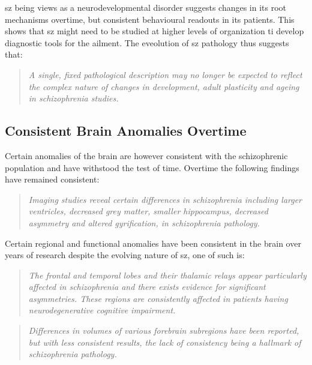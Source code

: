 \ac{sz} being views as a neurodevelopmental disorder suggests changes in its root mechanisms overtime, but consistent behavioural readouts in its patients. This shows that \ac{sz} might need to be studied at higher levels of organization ti develop diagnostic tools for the ailment. The eveolution of \ac{sz} pathology thus suggests that:
\begin{quotation}
	\textit{A single, fixed pathological description may no longer be expected to reflect the complex nature of changes in development, adult plasticity and ageing in schizophrenia studies.}
	\begin{flushright}
		\cite{bakhshi2015neuropathology}
	\end{flushright}
\end{quotation}

\subsection{Consistent Brain Anomalies Overtime}\label{brain_anomalies}
Certain anomalies of the brain are however consistent with the schizophrenic population and have withstood the test of time. Overtime the following findings have remained consistent:
\begin{quotation}
	\textit{Imaging studies reveal certain differences in schizophrenia including larger ventricles, decreased grey matter, smaller hippocampus, decreased asymmetry and altered gyrification, in schizophrenia pathology.}
	\begin{flushright}
		\cite{bakhshi2015neuropathology}
	\end{flushright}
\end{quotation}
Certain regional and functional anomalies have been consistent in the brain over years of research despite the evolving nature of \ac{sz}, one of such is:
\begin{quotation}
	\textit{The frontal and temporal lobes and their thalamic relays appear particularly affected in schizophrenia and there exists evidence for significant asymmetries. These regions are consistently affected in patients having neurodegenerative cognitive impairment.}
	\begin{flushright}
		\cite{halliday2001proceedings}
	\end{flushright}
\end{quotation}
\begin{quotation}
	\textit{Differences in volumes of various forebrain subregions have been reported, but with less consistent results, the lack of consistency being a hallmark of schizophrenia pathology.}
	\begin{flushright}
		\cite{bakhshi2015neuropathology}
	\end{flushright}
\end{quotation}
